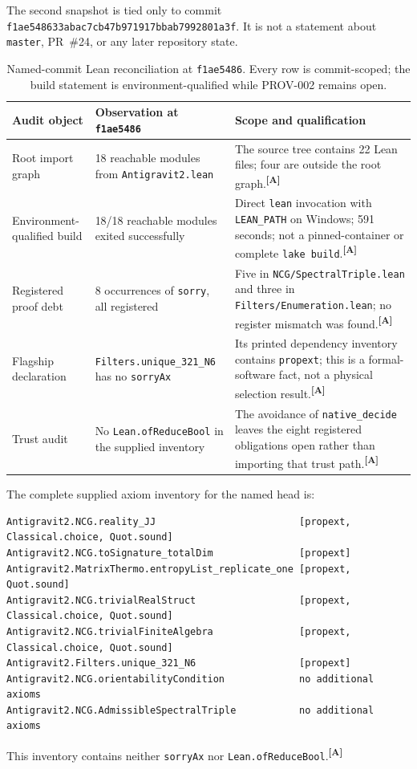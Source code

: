 \documentclass[12pt,a4paper,twoside]{article}
\theoremstyle{plain}
\theoremstyle{definition}
\theoremstyle{remark}
\newcommand{\catmark}[1]{\textsuperscript{\textsf{\textbf{[#1]}}}}
\begin{document}
The second snapshot is tied only to commit
\texttt{f1ae548633abac7cb47b971917bbab7992801a3f}. It is not a statement
about \texttt{master}, PR~\#24, or any later repository state.

\begin{table}[H]
\centering\small
\begin{tabular}{@{}lp{4.2cm}p{6.4cm}@{}}
\toprule
Audit object & Observation at \texttt{f1ae5486} & Scope and qualification \\
\midrule
Root import graph & 18 reachable modules from \texttt{Antigravit2.lean} &
The source tree contains 22 Lean files; four are outside the root graph.\catmark{A} \\
Environment-qualified build & 18/18 reachable modules exited successfully &
Direct \texttt{lean} invocation with \texttt{LEAN\_PATH} on Windows; 591 seconds; not a pinned-container or complete \texttt{lake build}.\catmark{A} \\
Registered proof debt & 8 occurrences of \texttt{sorry}, all registered &
Five in \texttt{NCG/SpectralTriple.lean} and three in \texttt{Filters/Enumeration.lean}; no register mismatch was found.\catmark{A} \\
Flagship declaration & \texttt{Filters.unique\_321\_N6} has no \texttt{sorryAx} &
Its printed dependency inventory contains \texttt{propext}; this is a formal-software fact, not a physical selection result.\catmark{A} \\
Trust audit & No \texttt{Lean.ofReduceBool} in the supplied inventory &
The avoidance of \texttt{native\_decide} leaves the eight registered obligations open rather than importing that trust path.\catmark{A} \\
\bottomrule
\end{tabular}
\caption{Named-commit Lean reconciliation at \texttt{f1ae5486}. Every row is commit-scoped; the build statement is environment-qualified while PROV-002 remains open.}
\label{tab:lean-status-f1ae5486}
\end{table}

The complete supplied axiom inventory for the named head is:
\begin{lstlisting}[basicstyle=\ttfamily\scriptsize,breaklines=true,columns=fullflexible]
Antigravit2.NCG.reality_JJ                         [propext, Classical.choice, Quot.sound]
Antigravit2.NCG.toSignature_totalDim               [propext]
Antigravit2.MatrixThermo.entropyList_replicate_one [propext, Quot.sound]
Antigravit2.NCG.trivialRealStruct                  [propext, Classical.choice, Quot.sound]
Antigravit2.NCG.trivialFiniteAlgebra               [propext, Classical.choice, Quot.sound]
Antigravit2.Filters.unique_321_N6                  [propext]
Antigravit2.NCG.orientabilityCondition             no additional axioms
Antigravit2.NCG.AdmissibleSpectralTriple           no additional axioms
\end{lstlisting}
This inventory contains neither \texttt{sorryAx} nor
\texttt{Lean.ofReduceBool}.\catmark{A}
\end{document}
